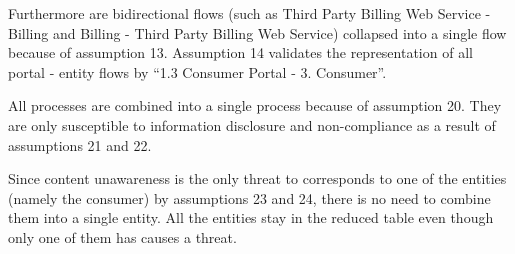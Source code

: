 \npar Furthermore are bidirectional flows (such as Third Party Billing Web
Service - Billing and Billing - Third Party Billing Web Service) collapsed into
a single flow because of assumption 13. Assumption 14 validates the
representation of all portal - entity flows by ``1.3 Consumer Portal - 3. Consumer''.

\npar All processes are combined into a single process because of assumption 20.
They are only susceptible to information disclosure and non-compliance as a
result of assumptions 21 and 22.

\npar Since content unawareness is the only threat to corresponds to one of the
entities (namely the consumer) by assumptions 23 and 24, there is no need to
combine them into a single entity. All the entities stay in the reduced table
even though only one of them has causes a threat.

